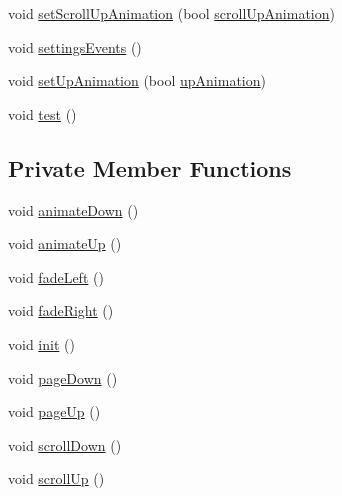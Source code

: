\begin{DoxyCompactItemize}
\item 
void \hyperlink{classSettings_a3527753c47290e4a3de380cc62abe353}{set\+Scroll\+Up\+Animation} (bool \hyperlink{classSettings_acef41c3ecdc8d54ae52e9dacf6a47bec}{scroll\+Up\+Animation})
\item 
void \hyperlink{classSettings_a3976a636038110c89e23506cfd980707}{settings\+Events} ()
\item 
void \hyperlink{classSettings_a176dc32eec32d3e22a2cb49a59f4f279}{set\+Up\+Animation} (bool \hyperlink{classSettings_a67a1520a803f8cd6c45d236f0be4796f}{up\+Animation})
\item 
void \hyperlink{classSettings_a042d54c37551fb94fc180557bb0b845f}{test} ()
\end{DoxyCompactItemize}
\subsection*{Private Member Functions}
\begin{DoxyCompactItemize}
\item 
void \hyperlink{classSettings_a57496310fa30eb01c0cf2d5c5a0b1119}{animate\+Down} ()
\item 
void \hyperlink{classSettings_aaf7aa8eba2a6e9cf3c69d417bfac45e3}{animate\+Up} ()
\item 
void \hyperlink{classSettings_aadfdd9d712f92c22f3bf7ea219df51fb}{fade\+Left} ()
\item 
void \hyperlink{classSettings_aea96eb70c9a38159ae38f514e6f598d2}{fade\+Right} ()
\item 
void \hyperlink{classSettings_ad47a8d3f696dcb0d38c1dc5088008885}{init} ()
\item 
void \hyperlink{classSettings_a5990c74e2a9622a466a69a45052eabed}{page\+Down} ()
\item 
void \hyperlink{classSettings_abd533093c1ebef5545eba511e95c5d65}{page\+Up} ()
\item 
void \hyperlink{classSettings_a455628093679d8ff5661f0cf17c45ea9}{scroll\+Down} ()
\item 
void \hyperlink{classSettings_aae74a0b5718c3a2c47725e12e96f634a}{scroll\+Up} ()
\end{DoxyCompactItemize}
